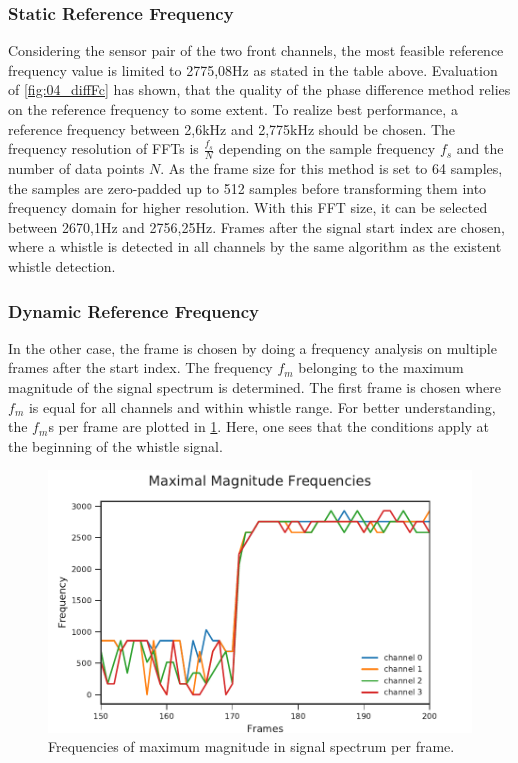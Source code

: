 \subsubsection*{Static Reference Frequency}

Considering the sensor pair of the two front channels, the most feasible
reference frequency value is limited to 2775,08\si{\hertz} as stated in the table above.
Evaluation of \cref{fig:04_diffFc} has shown, that the quality of the phase difference
method relies on the reference frequency to some extent.
To realize best performance, a reference frequency between 2,6\si{\kilo\hertz} and 2,775\si{\kilo\hertz}
should be chosen.
The frequency resolution of \acp{FFT} is $\frac{f_s}{N}$ depending on the sample frequency $f_s$ and
the number of data points $N$.
As the frame size for this method is set to 64 samples, the samples are zero-padded
up to 512 samples before transforming them into frequency domain for higher resolution.
With this \ac{FFT} size, it can be selected between 2670,1\si{\hertz}
and 2756,25\si{\hertz}.
Frames after the signal start index are chosen, where a whistle is detected
in all channels by the same algorithm as the existent whistle detection.

\subsubsection*{Dynamic Reference Frequency}

In the other case, the frame is chosen by doing a frequency analysis on
multiple frames after the start index.
The frequency $f_m$ belonging to the maximum magnitude of the signal spectrum
is determined.
The first frame is chosen where $f_m$ is equal for all channels and
within whistle range.
For better understanding, the $f_m$s per frame are plotted in \cref{fig:03_maxFreq}.
Here, one sees that the conditions apply at the beginning of the whistle signal.
\begin{figure}[ht]
	\centering
		\includegraphics[]{figures/maxFreq}
	\caption{Frequencies of maximum magnitude in signal spectrum per frame.}
    \label{fig:03_maxFreq}
\end{figure}
